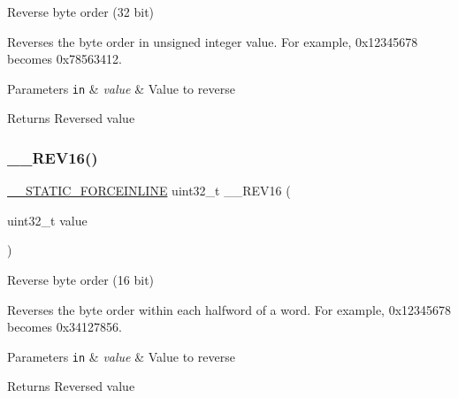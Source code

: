 Reverse byte order (32 bit) 

Reverses the byte order in unsigned integer value. For example, 0x12345678 becomes 0x78563412. 
\begin{DoxyParams}[1]{Parameters}
\mbox{\tt in}  & {\em value} & Value to reverse \\
\hline
\end{DoxyParams}
\begin{DoxyReturn}{Returns}
Reversed value 
\end{DoxyReturn}
\mbox{\label{group___c_m_s_i_s___core___instruction_interface_gaa12aedd096506c9639c1581acd5c6a78}} 
\subsubsection{\texorpdfstring{\+\_\+\+\_\+\+R\+E\+V16()}{\_\_REV16()}}
{\footnotesize\ttfamily \mbox{\hyperlink{cmsis__iccarm_8h_ab904513442afdf77d4f8c74f23cbb040}{\+\_\+\+\_\+\+S\+T\+A\+T\+I\+C\+\_\+\+F\+O\+R\+C\+E\+I\+N\+L\+I\+NE}} uint32\+\_\+t \+\_\+\+\_\+\+R\+E\+V16 (\begin{DoxyParamCaption}\item[{uint32\+\_\+t}]{value }\end{DoxyParamCaption})}



Reverse byte order (16 bit) 

Reverses the byte order within each halfword of a word. For example, 0x12345678 becomes 0x34127856. 
\begin{DoxyParams}[1]{Parameters}
\mbox{\tt in}  & {\em value} & Value to reverse \\
\hline
\end{DoxyParams}
\begin{DoxyReturn}{Returns}
Reversed value 
\end{DoxyReturn}
\mbox{\label{group___c_m_s_i_s___core___instruction_interface_gacb695341318226a5f69ed508166622ac}} 
